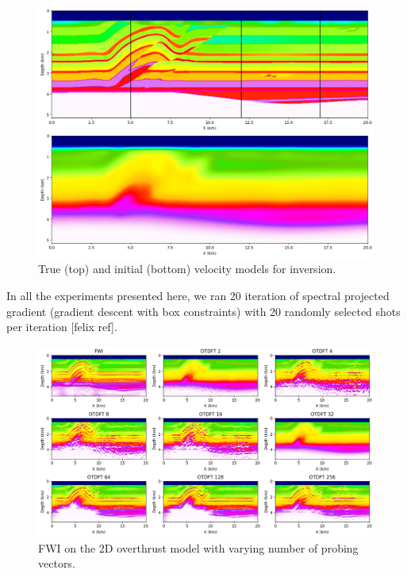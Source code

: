 \documentclass[]{segabs}
\begin{document}
\begin{figure}
\centering
\includegraphics[width=1.000\hsize]{./figures/init.png}
\caption*{True (top) and initial (bottom) velocity models for
inversion.}
\end{figure}

In all the experiments presented here, we ran 20 iteration of spectral
projected gradient (gradient descent with box constraints)
\citep{minconf} with 20 randomly selected shots per iteration {[}felix
ref{]}.

\begin{figure}
\centering
\includegraphics[width=1.000\hsize]{./figures/DFT_fwi.png}
\caption*{FWI on the 2D overthrust model with varying number of probing
vectors.}
\end{figure}
\end{document}
